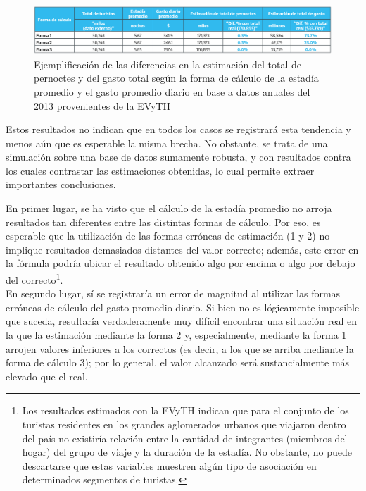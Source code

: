 \documentclass[
]{book}
\begin{document}
\begin{figure}

{\centering \includegraphics[width=1\linewidth]{imagenes/tabla_8} 

}

\caption{Ejemplificación de las diferencias en la estimación del total de pernoctes y del gasto total según la forma de cálculo de la estadía promedio y el gasto promedio diario en base a datos anuales del 2013 provenientes de la EVyTH}\label{fig:Formadecalculo}
\end{figure}

Estos resultados no indican que en todos los casos se registrará esta tendencia y menos aún que es esperable la misma brecha. No obstante, se trata de una simulación sobre una base de datos sumamente robusta, y con resultados contra los cuales contrastar las estimaciones obtenidas, lo cual permite extraer importantes conclusiones.

En primer lugar, se ha visto que el cálculo de la estadía promedio no arroja resultados tan diferentes entre las distintas formas de cálculo. Por eso, es esperable que la utilización de las formas erróneas de estimación (1 y 2) no implique resultados demasiados distantes del valor correcto; además, este error en la fórmula podría ubicar el resultado obtenido algo por encima o algo por debajo del correcto\footnote{Los resultados estimados con la EVyTH indican que para el conjunto de los turistas residentes en los grandes aglomerados urbanos que viajaron dentro del país no existiría relación entre la cantidad de integrantes (miembros del hogar) del grupo de viaje y la duración de la estadía. No obstante, no puede descartarse que estas variables muestren algún tipo de asociación en determinados segmentos de turistas.}.\\

En segundo lugar, sí se registraría un error de magnitud al utilizar las formas erróneas de cálculo del gasto promedio diario. Si bien no es lógicamente imposible que suceda, resultaría verdaderamente muy difícil encontrar una situación real en la que la estimación mediante la forma 2 y, especialmente, mediante la forma 1 arrojen valores inferiores a los correctos (es decir, a los que se arriba mediante la forma de cálculo 3); por lo general, el valor alcanzado será sustancialmente más elevado que el real.
\end{document}
